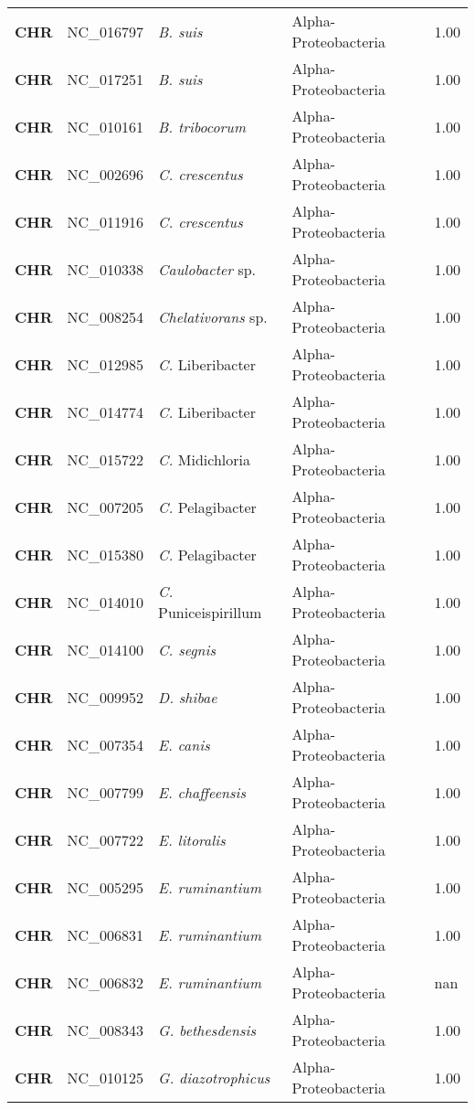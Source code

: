 \begin{adjustwidth}{-3cm}{2cm}
{\begin{supertabular}{>{\bfseries}l|p{0.1\textwidth}p{0.14\textwidth}l|l}
CHR & NC\_016797 & \textit{B. suis} & Alpha-Proteobacteria & 1.00\\
CHR & NC\_017251 & \textit{B. suis} & Alpha-Proteobacteria & 1.00\\
CHR & NC\_010161 & \textit{B. tribocorum} & Alpha-Proteobacteria & 1.00\\
CHR & NC\_002696 & \textit{C. crescentus} & Alpha-Proteobacteria & 1.00\\
CHR & NC\_011916 & \textit{C. crescentus} & Alpha-Proteobacteria & 1.00\\
CHR & NC\_010338 & \textit{Caulobacter} sp. & Alpha-Proteobacteria & 1.00\\
CHR & NC\_008254 & \textit{Chelativorans} sp. & Alpha-Proteobacteria & 1.00\\
CHR & NC\_012985 & \textit{C.} Liberibacter & Alpha-Proteobacteria & 1.00\\
CHR & NC\_014774 & \textit{C.} Liberibacter & Alpha-Proteobacteria & 1.00\\
CHR & NC\_015722 & \textit{C.} Midichloria & Alpha-Proteobacteria & 1.00\\
CHR & NC\_007205 & \textit{C.} Pelagibacter & Alpha-Proteobacteria & 1.00\\
CHR & NC\_015380 & \textit{C.} Pelagibacter & Alpha-Proteobacteria & 1.00\\
CHR & NC\_014010 & \textit{C.} Puniceispirillum & Alpha-Proteobacteria & 1.00\\
CHR & NC\_014100 & \textit{C. segnis} & Alpha-Proteobacteria & 1.00\\
CHR & NC\_009952 & \textit{D. shibae} & Alpha-Proteobacteria & 1.00\\
CHR & NC\_007354 & \textit{E. canis} & Alpha-Proteobacteria & 1.00\\
CHR & NC\_007799 & \textit{E. chaffeensis} & Alpha-Proteobacteria & 1.00\\
CHR & NC\_007722 & \textit{E. litoralis} & Alpha-Proteobacteria & 1.00\\
CHR & NC\_005295 & \textit{E. ruminantium} & Alpha-Proteobacteria & 1.00\\
CHR & NC\_006831 & \textit{E. ruminantium} & Alpha-Proteobacteria & 1.00\\
CHR & NC\_006832 & \textit{E. ruminantium} & Alpha-Proteobacteria & nan\\
CHR & NC\_008343 & \textit{G. bethesdensis} & Alpha-Proteobacteria & 1.00\\
CHR & NC\_010125 & \textit{G. diazotrophicus} & Alpha-Proteobacteria & 1.00\\

\end{supertabular}}
\end{adjustwidth}
